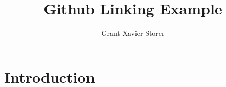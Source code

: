 \documentclass{article}
\title{Github Linking Example}
\author{Grant Xavier Storer}
\begin{document}
\maketitle

\section{Introduction}
\end{document}

